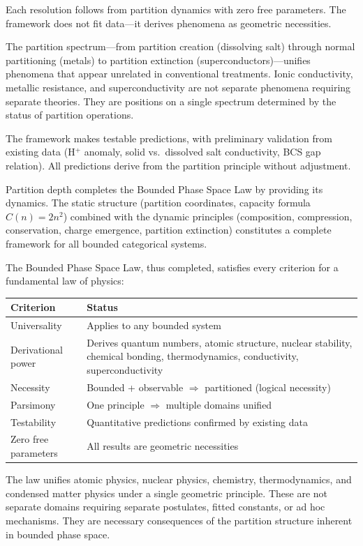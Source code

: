 \documentclass[twocolumn,10pt,a4paper]{article}
\theoremstyle{definition}
\theoremstyle{remark}
\begin{document}
Each resolution follows from partition dynamics with zero free parameters. The framework does not fit data---it derives phenomena as geometric necessities.

The partition spectrum---from partition creation (dissolving salt) through normal partitioning (metals) to partition extinction (superconductors)---unifies phenomena that appear unrelated in conventional treatments. Ionic conductivity, metallic resistance, and superconductivity are not separate phenomena requiring separate theories. They are positions on a single spectrum determined by the status of partition operations.

The framework makes testable predictions, with preliminary validation from existing data (H$^+$ anomaly, solid vs.~dissolved salt conductivity, BCS gap relation). All predictions derive from the partition principle without adjustment.

Partition depth completes the Bounded Phase Space Law by providing its dynamics. The static structure (partition coordinates, capacity formula $C(n) = 2n^2$) combined with the dynamic principles (composition, compression, conservation, charge emergence, partition extinction) constitutes a complete framework for all bounded categorical systems.

The Bounded Phase Space Law, thus completed, satisfies every criterion for a fundamental law of physics:

\begin{center}
\begin{tabular}{lp{6cm}}
\toprule
\textbf{Criterion} & \textbf{Status} \\
\midrule
Universality & Applies to any bounded system \\
Derivational power & Derives quantum numbers, atomic structure, nuclear stability, chemical bonding, thermodynamics, conductivity, superconductivity \\
Necessity & Bounded + observable $\Rightarrow$ partitioned (logical necessity) \\
Parsimony & One principle $\Rightarrow$ multiple domains unified \\
Testability & Quantitative predictions confirmed by existing data \\
Zero free parameters & All results are geometric necessities \\
\bottomrule
\end{tabular}
\end{center}

The law unifies atomic physics, nuclear physics, chemistry, thermodynamics, and condensed matter physics under a single geometric principle. These are not separate domains requiring separate postulates, fitted constants, or ad hoc mechanisms. They are necessary consequences of the partition structure inherent in bounded phase space.
\end{document}
